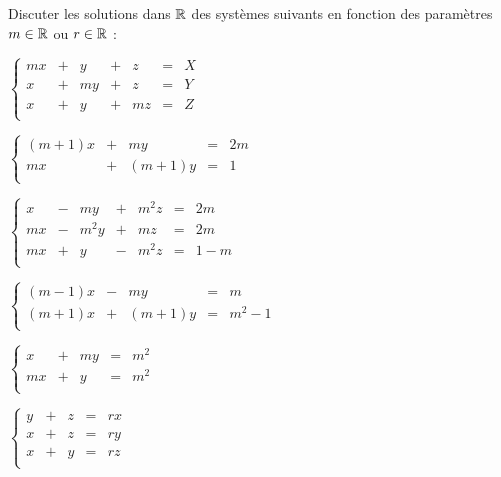 \documentclass[a4paper, 11pt,reqno]{article}
\begin{document}
\begin{exercice}  \;
Discuter les solutions dans $\mathbb{R}$ des syst\`emes suivants en fonction des param\`etres $m\in \mathbb{R}$ ou $r\in \mathbb{R}$ :
\begin{enumerate}
\begin{minipage}[t]{0.4\textwidth}
\item
$\left\lbrace\begin{array}{rcrcrcr}
mx &+ & y &+ & z & = & X\\
x &+ & my &+ & z & = & Y\\
x &+ & y &+ & mz & = & Z\\
\end{array}\right.$  
\vsec
\item 
$\left\lbrace\begin{array}{rcrcr}
(m+1)x & + & my & = & 2m\\
mx & + & (m+1)y & = & 1\\
\end{array}\right.$   
\vsec
\item 
$\left\lbrace\begin{array}{rcrcrcr}
x &- & my &+ & m^2z & = & 2m\\
mx &- & m^2y &+ & mz & = & 2m\\
mx &+ & y &- & m^2z & = & 1-m\\
\end{array}\right.$    
\end{minipage}
\begin{minipage}[t]{0.4\textwidth}
\item 
$\left\lbrace\begin{array}{rcrcr}
(m-1)x & - & my & = & m\\
(m+1)x & + & (m+1)y & = & m^2-1\\
\end{array}\right.$   
\vsec 
\item 
$\left\lbrace\begin{array}{rcrcr}
x & + & my & = & m^2\\
mx & + & y & = & m^2\\
\end{array}\right.$    
\vsec
\item 
$\left\lbrace\begin{array}{rcrcr}
y & + & z & = & rx\\
x & + & z & = & ry\\
x & + & y & = & rz\\
\end{array}\right.$ 
\end{minipage}  
\end{enumerate}
\end{exercice}
\end{document}
